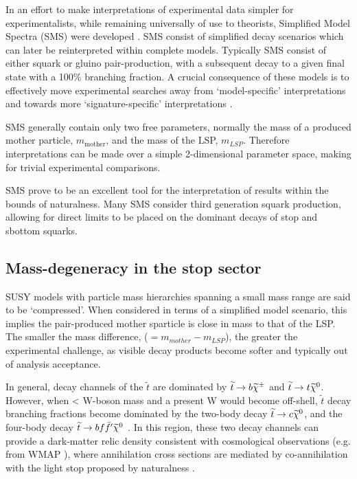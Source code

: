 In an effort to make interpretations of experimental data simpler for
experimentalists, while remaining universally of use to theorists,
Simplified Model Spectra (SMS) were developed
\cite{PhysRevD.79.075020,Alves:2011wf}.
SMS consist of simplified
decay scenarios which can later be reinterpreted within complete models.
Typically SMS consist of either squark or gluino pair-production, with a
subsequent decay to a given final state with a 100\% branching fraction.
A crucial consequence of these models is to effectively move
experimental searches away from `model-specific' interpretations and
towards more `signature-specific' interpretations \cite{PhysRevD.88.052017}.

SMS generally contain only two free parameters, normally the mass of a
produced mother particle, $m_{\text{mother}}$, and the mass of the LSP,
$m_{LSP}$. Therefore interpretations can be made over a simple 2-dimensional
parameter space, making for trivial experimental comparisons.

SMS prove to be an excellent tool for the interpretation of results
within the bounds of naturalness. Many SMS consider third generation
squark production, allowing for direct limits to be placed on the dominant
decays of stop and sbottom squarks.

\subsection{Mass-degeneracy in the stop sector}
SUSY models with particle mass hierarchies spanning a small mass range are said to be
`compressed'. When considered in terms of a simplified model scenario, this
implies the pair-produced mother sparticle is close in mass to that of the LSP.
The
smaller the mass difference, \deltam ($= m_{mother} - m_{LSP}$), the greater the
experimental challenge, as visible
decay products become softer and typically out of analysis acceptance.

In general, decay channels of the $\tilde{t}$ are dominated by
$\widetilde{t}\rightarrow b\widetilde{\chi}^{\pm}$ and
$\widetilde{t}\rightarrow t\widetilde{\chi}^{0}$. However, when \deltam < W-boson
mass and a present W would become off-shell, $\tilde{t}$ decay branching
fractions
become
dominated by the two-body decay $\widetilde{t}\rightarrow c\widetilde{\chi}^{0}$, and the four-body decay
$\widetilde{t}\rightarrow bf\bar{f}'\widetilde{\chi}^{0}$ \cite{Boehm:1999tr}. In this region, these two decay
channels can provide a dark-matter relic density consistent with cosmological
observations (e.g. from WMAP \cite{Spergel:2003cb}), where annihilation cross
sections
are mediated by co-annihilation with the light stop proposed by naturalness
\cite{Balazs:2004bu,Martin:2007gf}.

